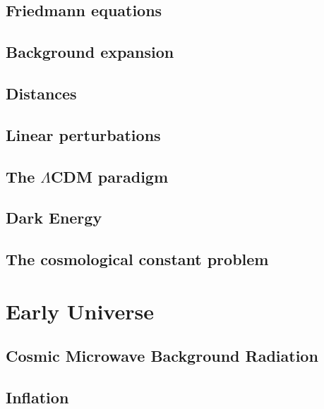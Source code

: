 \subsection{Friedmann equations}

\subsection{Background expansion}

\subsection{Distances}

\subsection{Linear perturbations}

\subsection{The $\Lambda$CDM paradigm}

\subsection{Dark Energy}

\subsection{The cosmological constant problem}





\section{Early Universe}

\subsection{Cosmic Microwave Background Radiation}

\subsection{Inflation}





